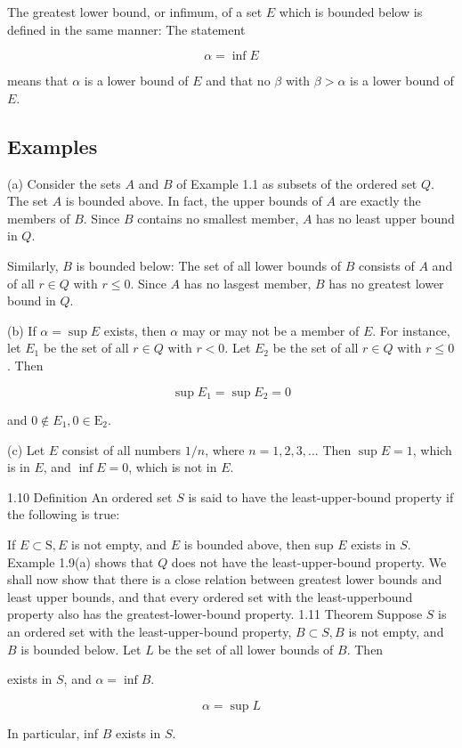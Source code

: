 \documentclass[10pt]{article}
\begin{document}
The greatest lower bound, or infimum, of a set $E$ which is bounded below is defined in the same manner: The statement

$$
\alpha=\inf E
$$

means that $\alpha$ is a lower bound of $E$ and that no $\beta$ with $\beta>\alpha$ is a lower bound of $E$.

\subsection{Examples}
(a) Consider the sets $A$ and $B$ of Example 1.1 as subsets of the ordered set $Q$. The set $A$ is bounded above. In fact, the upper bounds of $A$ are exactly the members of $B$. Since $B$ contains no smallest member, $A$ has no least upper bound in $Q$.

Similarly, $B$ is bounded below: The set of all lower bounds of $B$ consists of $A$ and of all $r \in Q$ with $r \leq 0$. Since $A$ has no lasgest member, $B$ has no greatest lower bound in $Q$.

(b) If $\alpha=\sup E$ exists, then $\alpha$ may or may not be a member of $E$. For instance, let $E_{1}$ be the set of all $r \in Q$ with $r<0$. Let $E_{2}$ be the set of all $r \in Q$ with $r \leq 0$. Then

$$
\sup E_{1}=\sup E_{2}=0
$$

and $0 \notin E_{1}, 0 \in \mathrm{E}_{2}$.

(c) Let $E$ consist of all numbers $1 / n$, where $n=1,2,3, \ldots$ Then $\sup E=1$, which is in $E$, and $\inf E=0$, which is not in $E$.

1.10 Definition An ordered set $S$ is said to have the least-upper-bound property if the following is true:

If $E \subset \mathrm{S}, E$ is not empty, and $E$ is bounded above, then sup $E$ exists in $S$. Example 1.9(a) shows that $Q$ does not have the least-upper-bound property. We shall now show that there is a close relation between greatest lower bounds and least upper bounds, and that every ordered set with the least-upperbound property also has the greatest-lower-bound property. 1.11 Theorem Suppose $S$ is an ordered set with the least-upper-bound property, $B \subset S, B$ is not empty, and $B$ is bounded below. Let $L$ be the set of all lower bounds of $B$. Then

exists in $S$, and $\alpha=\inf B$.

$$
\alpha=\sup L
$$

In particular, inf $B$ exists in $S$.
\end{document}
